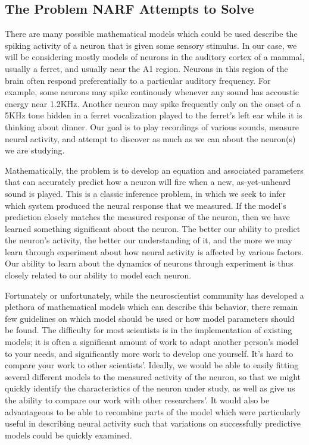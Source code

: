 \documentclass[letterpaper]{report}
\begin{document}
\subsection{The Problem NARF Attempts to Solve}

There are many possible mathematical models which could be used describe the spiking activity of a neuron that is given some sensory stimulus. In our case, we will be considering mostly models of neurons in the auditory cortex of a mammal, usually a ferret, and usually near the A1 region. Neurons in this region of the brain often respond preferentially to a particular auditory frequency. For example, some neurons may spike continously whenever any sound has accoustic energy near 1.2KHz. Another neuron may spike frequently only on the onset of a 5KHz tone hidden in a ferret vocalization played to the  ferret's left ear while it is thinking about dinner. Our goal is to play recordings of various sounds, measure neural activity, and attempt to discover as much as we can about the neuron(s) we are studying.

Mathematically, the problem is to develop an equation and associated parameters that can accurately predict how a neuron will fire when a new, as-yet-unheard sound is played. This is a classic inference problem, in which we seek to infer which system produced the neural response that we measured. If the model's prediction closely matches the measured response of the neuron, then we have learned something significant about the neuron. The better our ability to predict the neuron's activity, the better our understanding of it, and the more we may learn through experiment about how neural activity is affected by various factors. Our ability to learn about the dynamics of neurons through experiment is thus closely related to our ability to model each neuron.

Fortunately or unfortunately, while the neuroscientist community has developed a plethora of mathematical models which can describe this behavior, there remain few guidelines on which model should be used or how model parameters should be found. The difficulty for most scientists is in the implementation of existing models; it is often a significant amount of work to adapt another person's model to your needs, and significantly more work to develop one yourself. It's hard to compare your work to other scientists'. Ideally, we would be able to easily fitting several different models to the measured activity of the neuron, so that we might quickly identify the characteristics of the neuron under study, as well as give us the ability to compare our work with other researchers'. It would also be advantageous to be able to recombine parts of the model which were particularly useful in describing neural activity such that variations on successfully predictive models could be quickly examined. 
\end{document}
